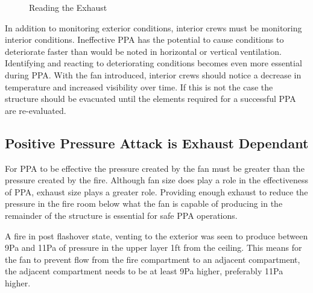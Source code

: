 \documentclass{article}
\begin{document}
\begin{figure}[H]
\begin{tabular}{c c c}
	\end{tabular}
	\caption{Reading the Exhaust}
	\label{fig:ReadExhaust}
\end{figure}

In addition to monitoring exterior conditions, interior crews must be monitoring interior conditions. Ineffective PPA has the potential to cause conditions to deteriorate faster than would be noted in horizontal or vertical ventilation. Identifying and reacting to deteriorating conditions becomes even more essential during PPA. With the fan introduced, interior crews should notice a decrease in temperature and increased visibility over time. If this is not the case the structure should be evacuated until the elements required for a successful PPA are re-evaluated.

\subsection{Positive Pressure Attack is Exhaust Dependant} \label{sec:ExhaustDepend}
For PPA to be effective the pressure created by the fan must be greater than the pressure created by the fire. Although fan size does play a role in the effectiveness of PPA, exhaust size plays a greater role. Providing enough exhaust to reduce the pressure in the fire room below what the fan is capable of producing in the remainder of the structure is essential for safe PPA operations.

A fire in post flashover state, venting to the exterior was seen to produce between 9Pa and 11Pa of pressure in the upper layer 1ft from the ceiling. This means for the fan to prevent flow from the fire compartment to an adjacent compartment, the adjacent compartment needs to be at least 9Pa higher, preferably 11Pa higher. 
\end{document}
